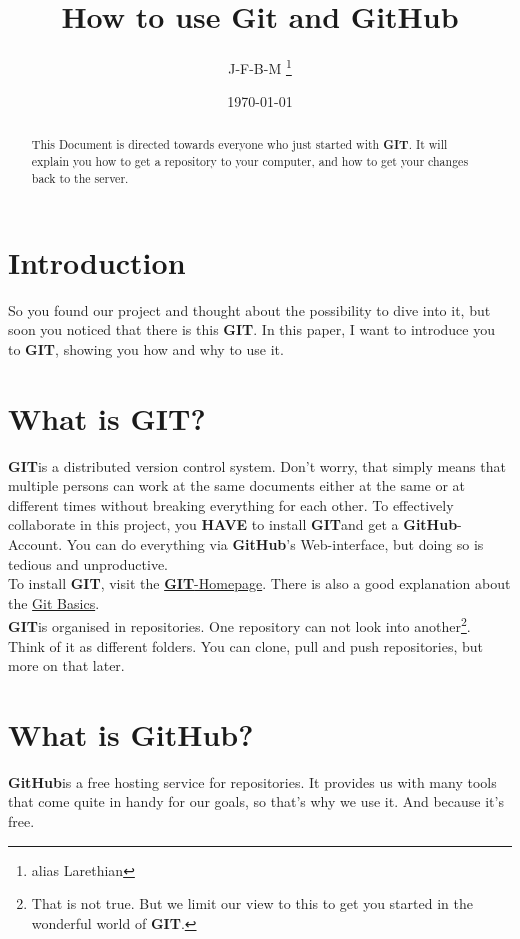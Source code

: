 \documentclass[a4paper]{article}
\title{How to use Git and GitHub}
\author{J-F-B-M \footnote{alias Larethian}}
\date{\today}
\newcommand{\git}{\textbf{GIT}}
\newcommand{\github}{\textbf{GitHub}}
\begin{document}
\maketitle
\tableofcontents

\begin{abstract}
	This Document is directed towards everyone who just started with \git . It will explain you how to get a repository to your computer, and how to get your changes back to the server.
\end{abstract}

\newpage

\section{Introduction}

So you found our project and thought about the possibility to dive into it, but soon you noticed that there is this \git. In this paper, I want to introduce you to \git, showing you how and why to use it.

\section{What is \git ?}

\git is a distributed version control system. Don't worry, that simply means that multiple persons can work at the same documents either at the same or at different times without breaking everything for each other. To effectively collaborate in this project, you \textbf{HAVE} to install \git and get a \github -Account. You can do everything via \github's Web-interface, but doing so is tedious and unproductive.\\
To install \git, visit the \href{http://git-scm.com/}{\git -Homepage}. There is also a good explanation about the \href{http://git-scm.com/book/en/v2/Getting-Started-Git-Basics}{Git Basics}.\\
\git is organised in repositories. One repository can not look into another\footnote{That is not true. But we limit our view to this to get you started in the wonderful world of \git.}. Think of it as different folders. You can clone, pull and push repositories, but more on that later.

\section{What is \github ?}

\github is a free hosting service for repositories. It provides us with many tools that come quite in handy for our goals, so that's why we use it. And because it's free.
\end{document}
